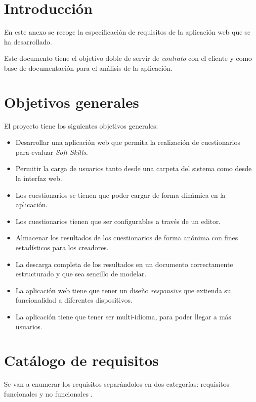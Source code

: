 
\section{Introducción}

En este anexo se recoge la especificación de requisitos de la aplicación web que se ha desarrollado.

Este documento tiene el objetivo doble de servir de \textit{contrato} con el cliente y como base de documentación para el análisis de la aplicación.

\section{Objetivos generales}

El proyecto tiene los siguientes objetivos generales:

\begin{itemize}
	\item Desarrollar una aplicación web que permita la realización de cuestionarios para evaluar \textit{Soft Skills}.
	\item Permitir la carga de usuarios tanto desde una carpeta del sistema como desde la interfaz web.
	\item Los cuestionarios se tienen que poder cargar de forma dinámica en la aplicación.
	\item Los cuestionarios tienen que ser configurables a través de un editor.
	\item Almacenar los resultados de los cuestionarios de forma anónima con fines estadísticos para los creadores.
	\item La descarga completa de los resultados en un documento correctamente estructurado y que sea sencillo de modelar.
	\item La aplicación web tiene que tener un diseño \textit{responsive} que extienda su funcionalidad a diferentes dispositivos.
	\item La aplicación tiene que tener ser multi-idioma, para poder llegar a más usuarios.
\end{itemize}

\section{Catálogo de requisitos}

Se van a enumerar los requisitos separándolos en dos categorías: requisitos funcionales y no funcionales \cite{web:requisitos}.

